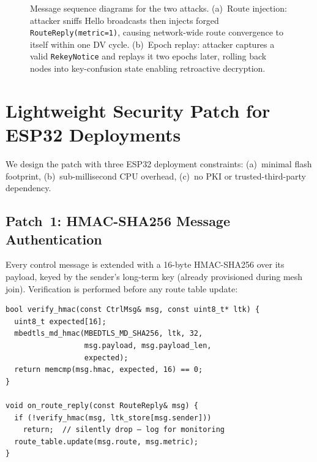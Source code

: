 \documentclass[10pt,journal,compsoc]{IEEEtran}
\begin{document}
\begin{figure}[t]
  \caption{Message sequence diagrams for the two attacks.
           (a)~Route injection: attacker sniffs Hello broadcasts then injects
           forged \texttt{RouteReply(metric=1)}, causing network-wide route
           convergence to itself within one DV cycle.
           (b)~Epoch replay: attacker captures a valid \texttt{RekeyNotice}
           and replays it two epochs later, rolling back nodes into
           key-confusion state enabling retroactive decryption.}
  \label{fig:attack-seq}
\end{figure}

\section{Lightweight Security Patch for ESP32 Deployments}
\label{sec:patch}

We design the patch with three ESP32 deployment constraints:
(a)~minimal flash footprint, (b)~sub-millisecond CPU overhead,
(c)~no PKI or trusted-third-party dependency.

\subsection{Patch~1: HMAC-SHA256 Message Authentication}

Every control message is extended with a 16-byte HMAC-SHA256
over its payload, keyed by the sender's long-term key
(already provisioned during mesh join). Verification is performed
before any route table update:

\begin{lstlisting}[caption={route.cpp — HMAC verification (23 lines)}]
bool verify_hmac(const CtrlMsg& msg, const uint8_t* ltk) {
  uint8_t expected[16];
  mbedtls_md_hmac(MBEDTLS_MD_SHA256, ltk, 32,
                  msg.payload, msg.payload_len,
                  expected);
  return memcmp(msg.hmac, expected, 16) == 0;
}

void on_route_reply(const RouteReply& msg) {
  if (!verify_hmac(msg, ltk_store[msg.sender]))
    return;  // silently drop — log for monitoring
  route_table.update(msg.route, msg.metric);
}
\end{lstlisting}
\end{document}
